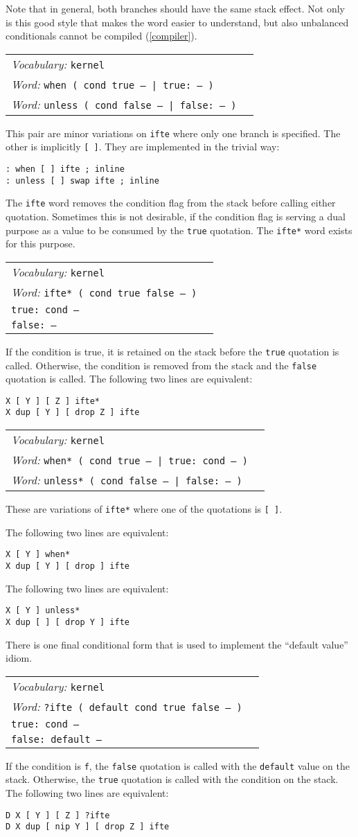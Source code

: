 \documentclass{book}
\newcommand{\vocabulary}[1]{\emph{Vocabulary:} \texttt{#1}&\\}
\newcommand{\ordinaryword}[2]{\index{\texttt{#1}}\emph{Word:} \texttt{#2}&\\}
\newcommand{\wordtable}[1]{


\begin{tabularx}{12cm}{lX}
\hline
#1
\hline
\end{tabularx}

}
\begin{document}
Note that in general, both branches should have the same stack effect. Not only is this good style that makes the word easier to understand, but also unbalanced conditionals cannot be compiled (\ref{compiler}).
\wordtable{
\vocabulary{kernel}
\ordinaryword{when}{when ( cond true -- | true:~-- )}
\ordinaryword{unless}{unless ( cond false -- | false:~-- )}
}
This pair are minor variations on \texttt{ifte} where only one branch is specified. The other is implicitly \texttt{[ ]}. They are implemented in the trivial way:
\begin{verbatim}
: when [ ] ifte ; inline
: unless [ ] swap ifte ; inline
\end{verbatim}
The \texttt{ifte} word removes the condition flag from the stack before calling either quotation. Sometimes this is not desirable, if the condition flag is serving a dual purpose as a value to be consumed by the \texttt{true} quotation. The \texttt{ifte*} word exists for this purpose.
\wordtable{
\vocabulary{kernel}
\ordinaryword{ifte*}{ifte*~( cond true false -- )}
\texttt{true:~cond --}\\
\texttt{false:~--}\\
}
If the condition is true, it is retained on the stack before the \texttt{true} quotation is called. Otherwise, the condition is removed from the stack and the \texttt{false} quotation is called. The following two lines are equivalent:
\begin{verbatim}
X [ Y ] [ Z ] ifte*
X dup [ Y ] [ drop Z ] ifte
\end{verbatim}
\wordtable{
\vocabulary{kernel}
\ordinaryword{when*}{when*~( cond true -- | true:~cond -- )}
\ordinaryword{unless*}{unless*~( cond false -- | false:~-- )}
}
These are variations of \texttt{ifte*} where one of the quotations is \texttt{[ ]}.

The following two lines are equivalent:
\begin{verbatim}
X [ Y ] when*
X dup [ Y ] [ drop ] ifte
\end{verbatim}
The following two lines are equivalent:
\begin{verbatim}
X [ Y ] unless*
X dup [ ] [ drop Y ] ifte
\end{verbatim}

There is one final conditional form that is used to implement the ``default value'' idiom.
\wordtable{
\vocabulary{kernel}
\ordinaryword{?ifte}{?ifte ( default cond true false -- )}
\texttt{true:~cond --}\\
\texttt{false:~default --}\\
}
If the condition is \texttt{f}, the \texttt{false} quotation is called with the \texttt{default} value on the stack. Otherwise, the \texttt{true} quotation is called with the condition on the stack. The following two lines are equivalent:
\begin{verbatim}
D X [ Y ] [ Z ] ?ifte
D X dup [ nip Y ] [ drop Z ] ifte
\end{verbatim}
\end{document}
